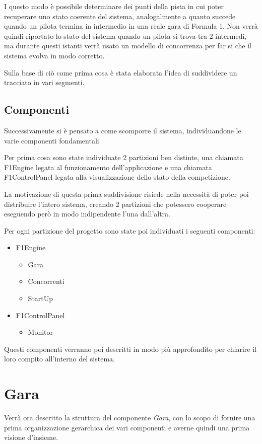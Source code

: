 \documentclass[a4paper,11pt, twoside]{book}
\begin{document}
	I questo modo è possibile determinare dei punti della pista in cui poter recuperare uno stato coerente del sistema,
	analogalmente a quanto succede quando un pilota termina in intermedio in una reale gara di Formula 1.
	Non verrà quindi riportato lo stato del sistema quando un pilota si trova tra 2 intermedi, ma durante questi
	istanti verrà usato un modello di concorrenza per far si che il sistema evolva in modo corretto.
	
	Sulla base di ciò come prima cosa è stata elaborata l'idea di suddividere un tracciato in vari segmenti.
	
      \subsection{Componenti}
	Successivamente si è pensato a come scomporre il sistema, individuandone le varie componenti fondamentali
      
	Per prima cosa sono state individuate 2 partizioni ben distinte, una chiamata F1Engine legata al 
	funzionamento dell'applicazione e una chiamata F1ControlPanel legata alla visualizzazione dello stato della competizione.
	
	La motivazione di questa prima suddivisione risiede nella necessità di poter poi distribuire l'intero sistema,
	creando 2 partizioni che potessero cooperare eseguendo però in modo indipendente l'una dall'altra.
	
	Per ogni partizione del progetto sono state poi individuati i seguenti componenti:
	
	\begin{itemize}
	  \item F1Engine
	  \begin{itemize}
	    \item Gara 
	    \item Concorrenti
	    \item StartUp
	  \end{itemize}
	  \item F1ControlPanel
	  \begin{itemize}
	    \item Monitor
	  \end{itemize}
	\end{itemize}
	
	Questi componenti verranno poi descritti in modo più approfondito per chiarire il loro compito all'interno del
	sistema.
	
    \section{Gara}
      Verrà ora descritto la struttura del componente \textsl{Gara}, con lo scopo di fornire una prima organizzazione gerarchica 
      dei vari componenti e averne quindi una prima visione d'insieme.
      
\end{document}
